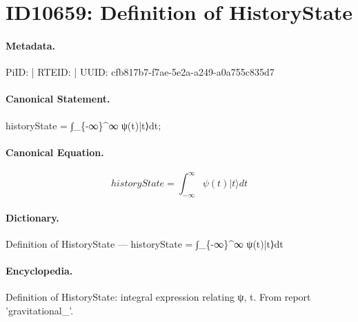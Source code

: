 \section*{ID10659: Definition of HistoryState}
\paragraph{Metadata.}
PiID:  | RTEID:  | UUID: cfb817b7-f7ae-5e2a-a249-a0a755c835d7

\paragraph{Canonical Statement.}
historyState = ∫\_\{-∞\}\textasciicircum{}∞ ψ(t)|t⟩dt;

\paragraph{Canonical Equation.}
\[
historyState = ∫_{-∞}^∞ ψ(t)|t⟩dt
\]

\paragraph{Dictionary.}
Definition of HistoryState — historyState = ∫\_\{-∞\}\textasciicircum{}∞ ψ(t)|t⟩dt

\paragraph{Encyclopedia.}
Definition of HistoryState: integral expression relating ψ, t. From report 'gravitational\_'.
